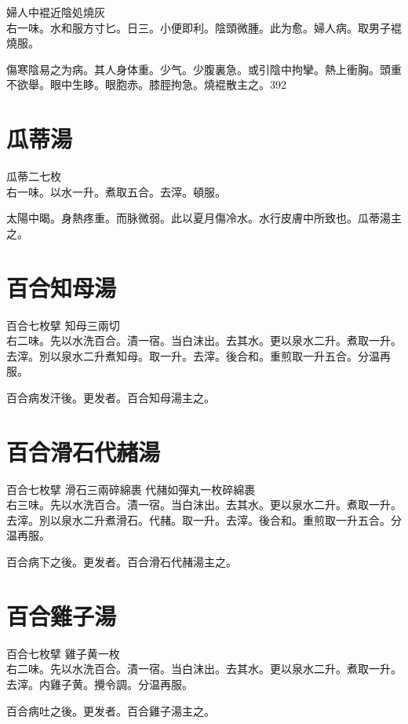 婦人中裩近陰処燒灰\\
右一味。水和服方寸匕。日三。小便即利。陰頭微腫。此为愈。婦人病。取男子裩燒服。

傷寒陰易之为病。其人身体重。少气。少腹裏急。或引陰中拘攣。熱上衝胸。頭重不欲舉。眼中生眵。{\khaaitp 眼胞赤。}膝脛拘急。燒裩散主之。392

\section{瓜蒂湯}

瓜蒂{\scriptsize 二七枚}\\
右一味。以水一升。煮取五合。去滓。頓服。

太陽中暍。身熱疼重。而脉微弱。此以夏月傷冷水。水行皮膚中所致也。瓜蒂湯主之。

\section{百合知母湯}

百合{\scriptsize 七枚擘} 知母{\scriptsize 三兩切}\\
右二味。先以水洗百合。漬一宿。当白沫出。去其水。更以泉水二升。煮取一升。去滓。別以泉水二升煮知母。取一升。去滓。後合和。重煎取一升五合。分温再服。

百合病发汗後。更发者。百合知母湯主之。

\section{百合滑石代赭湯}

百合{\scriptsize 七枚擘} 滑石{\scriptsize 三兩碎綿裹} 代赭{\scriptsize 如彈丸一枚碎綿裹}\\
右三味。先以水洗百合。漬一宿。当白沫出。去其水。更以泉水二升。煮取一升。去滓。別以泉水二升煮滑石。代赭。取一升。去滓。後合和。重煎取一升五合。分温再服。

百合病下之後。更发者。百合滑石代赭湯主之。

\section{百合雞子湯}

百合{\scriptsize 七枚擘} 雞子黄{\scriptsize 一枚}\\
右二味。先以水洗百合。漬一宿。当白沫出。去其水。更以泉水二升。煮取一升。去滓。内雞子黄。攪令調。分温再服。

百合病吐之後。更发者。百合雞子湯主之。

